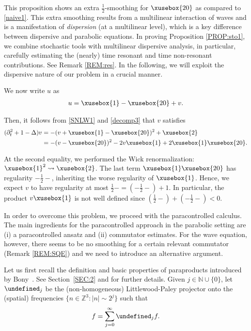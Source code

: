 \documentclass[%
11pt,  reqno]{amsart}
\def\<#1>{\xusebox{#1}}
\newcommand{\1}{\hspace{0.2mm}\text{I}\hspace{0.2mm}}
\newcommand{\noi}{\noindent}
\newcommand{\Z}{\mathbb{Z}}
\let\P= \undefined
\newcommand{\P}{\mathbf{P}}
\newcommand{\Dl}{\Delta}
\newcommand{\dt}{\partial_t}
\newcommand{\N}{\mathbb{N}}
\numberwithin{equation}{section}
\numberwithin{theorem}{section}
\begin{document}
This proposition shows an extra $\frac 12$-smoothing
for $\<20>$ as compared to \eqref{naive1}.
This extra smoothing results from a multilinear interaction of waves
and is a manifestation of {\it dispersion} (at a multilinear level), 
which is  a key difference between  dispersive and parabolic equations.
In proving Proposition \ref{PROP:sto1}, 
we combine stochastic tools with multilinear dispersive analysis, 
in particular, carefully estimating
the  (nearly) time resonant and time non-resonant contributions.
See Remark \ref{REM:res}.
In the following, we will exploit
the dispersive nature of our problem in a crucial manner. 

We now write $u$ as 
\begin{align}
u = \<1> - \<20> + v.
\label{decomp3}
\end{align}




\noi
Then, it follows from \eqref{SNLW1} and \eqref{decomp3} that $v$ satisfies
\begin{align*}
(\dt^2  +1 -  \Dl)  v 
&  =  - (v + \<1> - \<20>)^2 + \<2>\notag \\
& = -  (v  - \<20>)^2 -2 v \<1> + 2 \<1>\<20>.
\end{align*}

\noi
At the second equality,  we performed the Wick renormalization: $\<1>^2 \rightsquigarrow \<2>$.
The last term  $\<1>\<20>$ 
has regularity $-\frac 12 -$, inheriting the worse regularity of $\<1>$.
Hence, we expect $v$ to have regularity at most $\frac 12- = (-\frac 12-) + 1$.
In particular, the product 
$v \<1>$ is not well defined since $(\frac 12-) + (-\frac 12-) < 0$.




In order to overcome this problem, 
we proceed with the paracontrolled calculus.
The main ingredients for the paracontrolled approach in the parabolic setting
are (i) a paracontrolled ansatz 
and (ii) commutator estimates.
For the wave equation, however, 
there seems to be no smoothing for a certain relevant commutator
(Remark \ref{REM:SQE})
and we need to introduce an alternative argument. 

Let us first recall
 the definition and basic properties of  paraproducts
 introduced by Bony~\cite{Bony}.
 See Section~\ref{SEC:2} and \cite{BCD, GIP} for further details.
Given $j \in \N\cup\{0\}$,  let $\P_{j}$
 be the (non-homogeneous) Littlewood-Paley projector
 onto the (spatial) frequencies $\{n \in \Z^3: |n|\sim 2^j\}$
 such that 
 \[ f = \sum_{j = 0}^\infty \P_jf.\]
 
\end{document}
